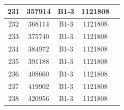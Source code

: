 \documentclass[UTF8,10pt,a4paper,fontset=fandol]{ctexart}
\newcommand{\fieldvalue}[1]{#1}
\begin{document}
\begin{center}
\begin{tabular}{|c|c|c|c|c|}
231 &
\fieldvalue{357914} &
\fieldvalue{B1-3} &
\fieldvalue{1121808} & \\ \hline
232 &
\fieldvalue{368114} &
\fieldvalue{B1-3} &
\fieldvalue{1121808} & \\ \hline
233 &
\fieldvalue{375740} &
\fieldvalue{B1-3} &
\fieldvalue{1121808} & \\ \hline
234 &
\fieldvalue{384972} &
\fieldvalue{B1-3} &
\fieldvalue{1121808} & \\ \hline
235 &
\fieldvalue{391188} &
\fieldvalue{B1-3} &
\fieldvalue{1121808} & \\ \hline
236 &
\fieldvalue{408660} &
\fieldvalue{B1-3} &
\fieldvalue{1121808} & \\ \hline
237 &
\fieldvalue{419902} &
\fieldvalue{B1-3} &
\fieldvalue{1121808} & \\ \hline
238 &
\fieldvalue{420956} &
\fieldvalue{B1-3} &
\fieldvalue{1121808} & \\ \hline

\end{tabular}
\end{center}
\end{document}
